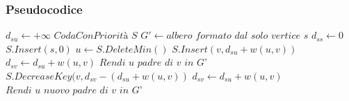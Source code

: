 \documentclass[a4paper]{article}
\begin{document}
\subsubsection{Pseudocodice}
\begin{algorithm}[H]
\caption{$Dijkstra\,(grafo\; G, vertice\; s) \rightarrow albero\; G'$}\label{euclid}
\begin{algorithmic}[1]
\State $d_{su} \gets +\infty$
\EndFor
\State $\textit{CodaConPriorità S}$
\State $G' \gets \textit{albero formato dal solo vertice s}$
\State $d_{ss} \gets 0$
\State $S.Insert(s,0)$
\State $u \gets S.DeleteMin()$
\State $S.Insert(v, d_{su}+w(u,v))$
\State $d_{sv} \gets d_{su}+w(u,v)$
\State $\textit{Rendi u padre di v in G'}$
\State $S.DecreaseKey(v, d_{sv}-(d_{su} + w(u,v))$
\State $d_{sv} \gets d_{su}+w(u,v)$
\State $\textit{Rendi u nuovo padre di v in G'}$
\EndIf
\EndFor
\EndWhile
{}
\end{algorithmic}
\end{algorithm}
\newpage
\end{document}
